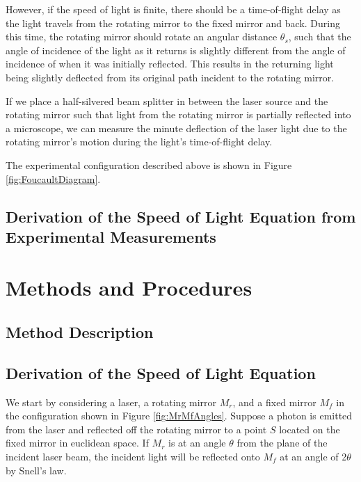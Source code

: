 \documentclass[twocolumn]{article}
\begin{document}
		However, if the speed of light is finite, there should be a time-of-flight delay as the light travels from the rotating mirror to the fixed mirror and back.
		During this time, the rotating mirror should rotate an angular distance $\theta_s$, such that the angle of incidence of the light as it returns is slightly different from the angle of incidence of when it was initially reflected.
		This results in the returning light being slightly deflected from its original path incident to the rotating mirror.
		
		If we place a half-silvered beam splitter in between the laser source and the rotating mirror such that light from the rotating mirror is partially reflected into a microscope, we can measure the minute deflection of the laser light due to the rotating mirror's motion during the light's time-of-flight delay.
		
		The experimental configuration described above is shown in Figure \ref{fig:FoucaultDiagram}.
		
		\subsection{Derivation of the Speed of Light Equation from Experimental Measurements}
		
\section{Methods and Procedures}
	\label{sec:Methods}
	\subsection{Method Description}
	\subsection{Derivation of the Speed of Light Equation}
	We start by considering a laser, a rotating mirror $M_r$, and a fixed mirror $M_f$ in the configuration shown in Figure \ref{fig:MrMfAngles}. 
	Suppose a photon is emitted from the laser and reflected off the rotating mirror to a point $S$ located on the fixed mirror in euclidean space. 
	If $M_r$ is at an angle $\theta$ from the plane of the incident laser beam, the incident light will be reflected onto $M_f$ at an angle of 2$\theta$ by Snell's law.
	
\end{document}
